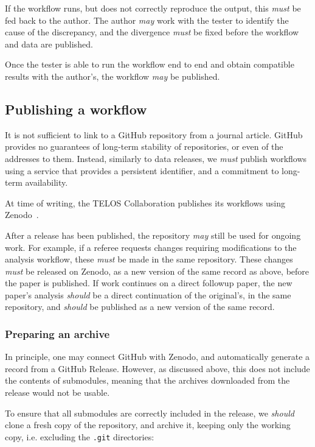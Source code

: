 \documentclass{article}
\newcommand\rfcword[1]{\emph{#1}\xspace}
\newcommand\must{\rfcword{must}}
\newcommand\should{\rfcword{should}}
\newcommand\may{\rfcword{may}}
\newcommand\filename[1]{\texttt{#1}\xspace}
\begin{document}
If the workflow runs,
but does not correctly reproduce the output,
this \must be fed back to the author.
The author \may work with the tester to identify the cause of the discrepancy,
and the divergence \must be fixed before the workflow and data are published.

Once the tester is able to run the workflow end to end
and obtain compatible results with the author's,
the workflow \may be published.

\subsection{Publishing a workflow}

It is not sufficient to link to a GitHub repository from a journal article.
GitHub provides no guarantees of long-term stability of repositories,
or even of the addresses to them.
Instead,
similarly to data releases,
we \must publish workflows using a service that provides a persistent identifier,
and a commitment to long-term availability.

At time of writing,
the TELOS Collaboration publishes its workflows using Zenodo~\cite{zenodo}.

After a release has been published,
the repository \may still be used for ongoing work.
For example,
if a referee requests changes requiring modifications to the analysis workflow,
these \must be made in the same repository.
These changes \must be released on Zenodo,
as a new version of the same record as above,
before the paper is published.
If work continues on a direct followup paper,
the new paper's analysis \should be a direct continuation of the original's,
in the same repository,
and \should be published as a new version of the same record.

\subsubsection{Preparing an archive}

In principle,
one may connect GitHub with Zenodo,
and automatically generate a record from a GitHub Release.
However,
as discussed above,
this does not include the contents of submodules,
meaning that the archives downloaded from the release would not be usable.

To ensure that all submodules are correctly included in the release,
we \should clone a fresh copy of the repository,
and archive it,
keeping only the working copy,
i.e. excluding the \filename{.git} directories:
\end{document}
